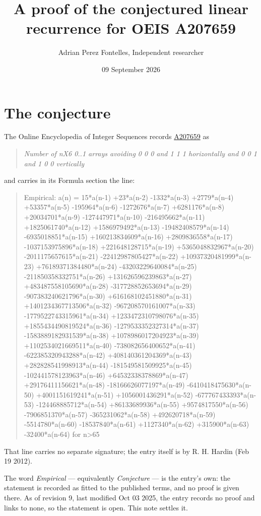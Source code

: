 \documentclass[11pt]{article}
\title{A proof of the conjectured linear recurrence for OEIS A207659}
\author{Adrian Perez Fontelles, Independent researcher}
\date{09 September 2026}
\theoremstyle{definition}
\begin{document}
\maketitle
\section{The conjecture}

The Online Encyclopedia of Integer Sequences records \href{https://oeis.org/A207659}{A207659} as

\begin{quote}\itshape Number of nX6 0..1 arrays avoiding 0 0 0 and 1 1 1 horizontally and 0 0 1 and 1 0 0 vertically\end{quote}

and carries in its Formula section the line:

\begin{quote}\ttfamily Empirical: a(n) = 15*a(n-1) +23*a(n-2) -1332*a(n-3) +2779*a(n-4) +53357*a(n-5) -195964*a(n-6) -1272676*a(n-7) +6281176*a(n-8) +20034701*a(n-9) -127447971*a(n-10) -216495662*a(n-11) +1825061740*a(n-12) +1586979492*a(n-13) -19482408579*a(n-14) -6935018851*a(n-15) +160213834609*a(n-16) +2809836558*a(n-17) -1037153975896*a(n-18) +221648128715*a(n-19) +5365048832967*a(n-20) -2011175657615*a(n-21) -22412987805427*a(n-22) +10937320481999*a(n-23) +76189371384480*a(n-24) -43203229640084*a(n-25) -211850358332751*a(n-26) +131626596239863*a(n-27) +483487558105690*a(n-28) -317728852653694*a(n-29) -907383240621796*a(n-30) +616168102451880*a(n-31) +1401234367713506*a(n-32) -967208570161007*a(n-33) -1779522743315961*a(n-34) +1233472310798076*a(n-35) +1855434490819524*a(n-36) -1279533352327314*a(n-37) -1583889182931539*a(n-38) +1078986017204923*a(n-39) +1102534021669511*a(n-40) -738082656400652*a(n-41) -622385320943288*a(n-42) +408140361204369*a(n-43) +282828541998913*a(n-44) -181549581509925*a(n-45) -102441578123963*a(n-46) +64532338378869*a(n-47) +29176411156621*a(n-48) -18166626077197*a(n-49) -6410418475630*a(n-50) +4001151619241*a(n-51) +1056001436291*a(n-52) -677767433393*a(n-53) -124468885712*a(n-54) +86133689936*a(n-55) +9574817550*a(n-56) -7906851370*a(n-57) -365231062*a(n-58) +492620718*a(n-59) -5514780*a(n-60) -18537840*a(n-61) +1127340*a(n-62) +315900*a(n-63) -32400*a(n-64) for n>65\end{quote}

That line carries no separate signature; the entry itself is by R. H. Hardin (Feb 19 2012).

The word {\itshape Empirical} --- equivalently {\itshape Conjecture} --- is the entry's own: the statement is recorded as fitted to the published terms, and no proof is given there. As of revision 9, last modified Oct 03 2025, the entry records no proof and links to none, so the statement is open. This note settles it.
\end{document}
